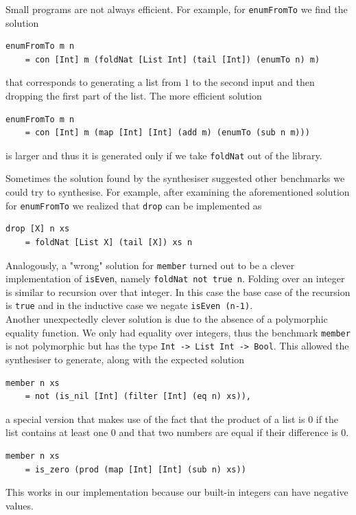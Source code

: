 Small programs are not always efficient. For example, for \lstinline?enumFromTo? we find the solution
\begin{lstlisting}
enumFromTo m n
    = con [Int] m (foldNat [List Int] (tail [Int]) (enumTo n) m)
\end{lstlisting}
that corresponds to generating a list from $1$ to the second input and then dropping the first part of the list. The more efficient solution
\begin{lstlisting}
enumFromTo m n
    = con [Int] m (map [Int] [Int] (add m) (enumTo (sub n m)))
\end{lstlisting}
is larger and thus it is generated only if we take \lstinline?foldNat? out of the library.

Sometimes the solution found by the synthesiser suggested other benchmarks we could try to synthesise. For example, after examining the aforementioned solution for \lstinline?enumFromTo? we realized that \lstinline?drop? can be implemented as
\begin{lstlisting}
drop [X] n xs
    = foldNat [List X] (tail [X]) xs n
\end{lstlisting}
Analogously, a "wrong" solution for \lstinline?member? turned out to be a clever implementation of \lstinline?isEven?, namely \lstinline?foldNat not true n?. Folding over an integer is similar to recursion over that integer. In this case the base case of the recursion is \lstinline?true? and in the inductive case we negate \lstinline?isEven (n-1)?.\\
Another unexpectedly clever solution is due to the absence of a polymorphic equality function. We only had equality over integers, thus the benchmark \lstinline?member? is not polymorphic but has the type \lstinline?Int -> List Int -> Bool?. This allowed the synthesiser to generate, along with the expected solution
\begin{lstlisting}
member n xs
    = not (is_nil [Int] (filter [Int] (eq n) xs)),
\end{lstlisting}
a special version that makes use of the fact that the product of a list is $0$ if the list contains at least one $0$ and that two numbers are equal if their difference is $0$.
\begin{lstlisting}
member n xs
    = is_zero (prod (map [Int] [Int] (sub n) xs))
\end{lstlisting}
This works in our implementation because our built-in integers can have negative values.

